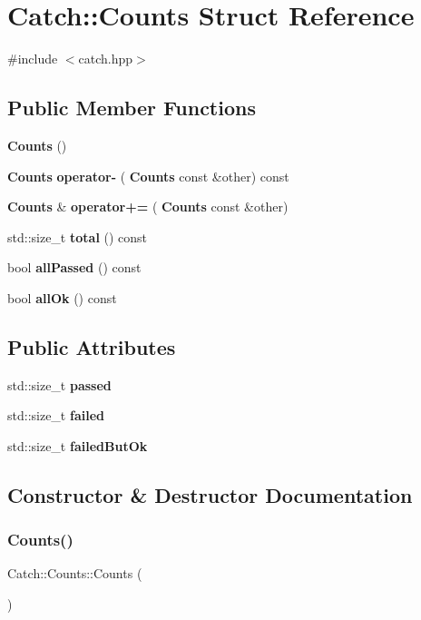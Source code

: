 \section{Catch\+:\+:Counts Struct Reference}
\label{struct_catch_1_1_counts}


{\ttfamily \#include $<$catch.\+hpp$>$}

\subsection*{Public Member Functions}
\begin{DoxyCompactItemize}
\item 
\textbf{ Counts} ()
\item 
\textbf{ Counts} \textbf{ operator-\/} (\textbf{ Counts} const \&other) const
\item 
\textbf{ Counts} \& \textbf{ operator+=} (\textbf{ Counts} const \&other)
\item 
std\+::size\+\_\+t \textbf{ total} () const
\item 
bool \textbf{ all\+Passed} () const
\item 
bool \textbf{ all\+Ok} () const
\end{DoxyCompactItemize}
\subsection*{Public Attributes}
\begin{DoxyCompactItemize}
\item 
std\+::size\+\_\+t \textbf{ passed}
\item 
std\+::size\+\_\+t \textbf{ failed}
\item 
std\+::size\+\_\+t \textbf{ failed\+But\+Ok}
\end{DoxyCompactItemize}


\subsection{Constructor \& Destructor Documentation}
\mbox{\label{struct_catch_1_1_counts_aab9092ce70d4b0179cc743555d2fc39b}} 
\subsubsection{Counts()}
{\footnotesize\ttfamily Catch\+::\+Counts\+::\+Counts (\begin{DoxyParamCaption}{ }\end{DoxyParamCaption})\hspace{0.3cm}{\ttfamily [inline]}}



